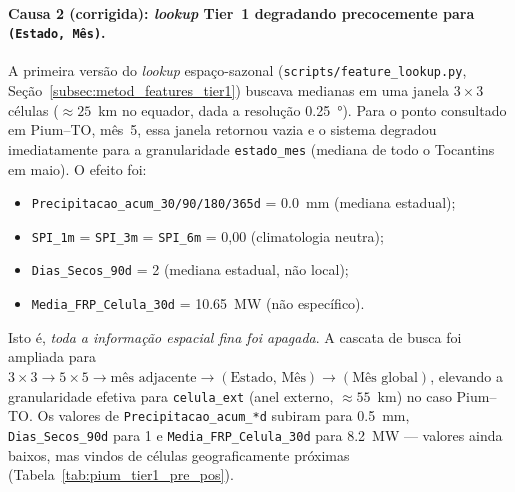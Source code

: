 \paragraph{Causa 2 (corrigida): \emph{lookup} Tier~1 degradando precocemente para \texttt{(Estado, Mês)}.}

A primeira versão do \emph{lookup} espaço-sazonal (\texttt{scripts/feature\_lookup.py}, Seção~\ref{subsec:metod_features_tier1}) buscava medianas em uma janela ${3{\times}3}$ células ($\approx 25$~km no equador, dada a resolução \SI{0,25}{\degree}). Para o ponto consultado em Pium--TO, mês~5, essa janela retornou vazia e o sistema degradou imediatamente para a granularidade \texttt{estado\_mes} (mediana de todo o Tocantins em maio). O efeito foi:

\begin{itemize}
  \item \texttt{Precipitacao\_acum\_30/90/180/365d} = \SI{0,0}{mm} (mediana estadual);
  \item \texttt{SPI\_1m} = \texttt{SPI\_3m} = \texttt{SPI\_6m} = 0,00 (climatologia neutra);
  \item \texttt{Dias\_Secos\_90d} = 2 (mediana estadual, não local);
  \item \texttt{Media\_FRP\_Celula\_30d} = \SI{10,65}{\mega\watt} (não específico).
\end{itemize}

Isto é, \emph{toda a informação espacial fina foi apagada}. A cascata de busca foi ampliada para
\(3{\times}3 \to 5{\times}5 \to \text{mês adjacente} \to (\text{Estado, Mês}) \to (\text{Mês global})\),
elevando a granularidade efetiva para \texttt{celula\_ext} (anel externo, $\approx 55$~km) no caso Pium--TO. Os valores de \texttt{Precipitacao\_acum\_*d} subiram para \SI{0,5}{mm}, \texttt{Dias\_Secos\_90d} para 1 e \texttt{Media\_FRP\_Celula\_30d} para \SI{8,2}{\mega\watt} --- valores ainda baixos, mas vindos de células geograficamente próximas (Tabela~\ref{tab:pium_tier1_pre_pos}).

